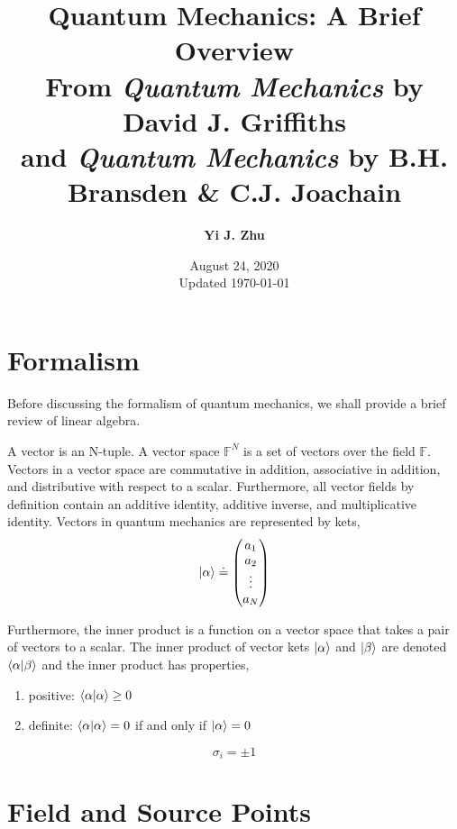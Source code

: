 \documentclass[12pt]{report}
\numberwithin{equation}{section}
\begin{document}
	
	\title{\textbf{Quantum Mechanics: A Brief Overview\newline\\\normalsize From \textit{Quantum Mechanics} by David J. Griffiths \\and \textit{Quantum Mechanics} by B.H. Bransden \& C.J. Joachain}}
	\author{\textbf{Yi J. Zhu}}
	\date{August 24, 2020\\\vspace{1em}\small Updated \today}
	\maketitle
	\thispagestyle{empty}
	
	\tableofcontents
	
	\chapter{Formalism}

	Before discussing the formalism of quantum mechanics, we shall provide a brief review of linear algebra. 
	
	A vector is an N-tuple. A vector space $ \mathbb{F}^N $ is a set of vectors over the field $ \mathbb{F} $. Vectors in a vector space are commutative in addition, associative in addition, and distributive with respect to a scalar. Furthermore, all vector fields by definition contain an additive identity, additive inverse, and multiplicative identity. Vectors in quantum mechanics are represented by kets,
	\begin{equation}
			\ket{\alpha} \doteq \begin{pmatrix}a_1\\a_2\\\vdots\\a_N\end{pmatrix}
	\end{equation}
	
	Furthermore, the inner product is a function on a vector space that takes a pair of vectors to a scalar. The inner product of vector kets $ \ket{\alpha} $ and $ \ket{\beta} $ are denoted $ \braket{\alpha}{\beta} $ and the inner product has properties, 
	\begin{enumerate}
		\item positive: $ \braket{\alpha}{\alpha} \geq 0$
		\item definite: $ \braket{\alpha}{\alpha} = 0$ if and only if $ \ket{\alpha} = 0 $ 
	\end{enumerate}

	\begin{equation}
			\sigma_i = \pm 1
	\end{equation}
	
	
	
	\nocite{*}
	
	\appendix
	\chapter{Field and Source Points}
\end{document}
